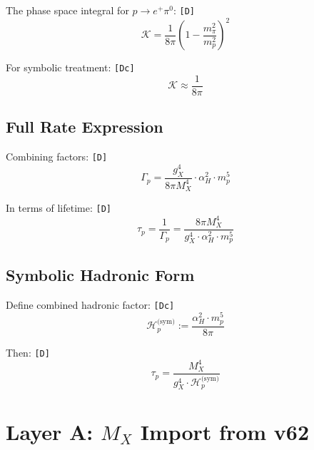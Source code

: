 \documentclass[11pt,a4paper]{article}
\newcommand{\tagD}{\textcolor{green!50!black}{\texttt{[D]}}}
\newcommand{\tagDc}{\textcolor{blue!70!black}{\texttt{[Dc]}}}
\theoremstyle{definition}
\begin{document}
The phase space integral for $p \to e^+ \pi^0$: \tagD{}
\begin{equation}
\label{eq:phase-space}
\mathcal{K} = \frac{1}{8\pi} \left(1 - \frac{m_\pi^2}{m_p^2}\right)^2
\end{equation}

For symbolic treatment: \tagDc{}
\begin{equation}
\label{eq:phase-space-approx}
\mathcal{K} \approx \frac{1}{8\pi}
\end{equation}

\subsection{Full Rate Expression}
\label{subsec:full-rate}

Combining factors: \tagD{}
\begin{equation}
\label{eq:full-rate}
\Gamma_p = \frac{g_X^4}{8\pi M_X^4} \cdot \alpha_H^2 \cdot m_p^5
\end{equation}

In terms of lifetime: \tagD{}
\begin{equation}
\label{eq:lifetime-from-rate}
\tau_p = \frac{1}{\Gamma_p} = \frac{8\pi M_X^4}{g_X^4 \cdot \alpha_H^2 \cdot m_p^5}
\end{equation}

\subsection{Symbolic Hadronic Form}
\label{subsec:symbolic-hadronic}

Define combined hadronic factor: \tagDc{}
\begin{equation}
\label{eq:combined-hadronic}
\mathcal{H}_p^{\text{(sym)}} := \frac{\alpha_H^2 \cdot m_p^5}{8\pi}
\end{equation}

Then: \tagD{}
\begin{equation}
\label{eq:lifetime-symbolic}
\boxed{\tau_p = \frac{M_X^4}{g_X^4 \cdot \mathcal{H}_p^{\text{(sym)}}}}
\end{equation}

\section{Layer A: $M_X$ Import from v62}
\label{sec:mx-import}
\end{document}
